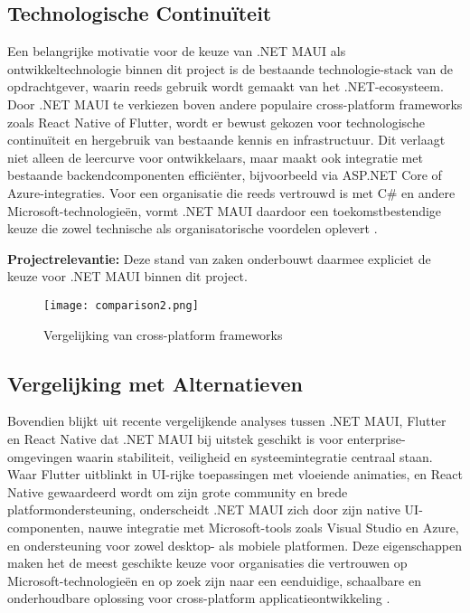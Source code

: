 \subsection{Technologische Continuïteit}
Een belangrijke motivatie voor de keuze van .NET MAUI als ontwikkeltechnologie binnen dit project is de bestaande technologie-stack van de opdrachtgever, waarin reeds gebruik wordt gemaakt van het .NET-ecosysteem. Door .NET MAUI te verkiezen boven andere populaire cross-platform frameworks zoals React Native of Flutter, wordt er bewust gekozen voor technologische continuïteit en hergebruik van bestaande kennis en infrastructuur. Dit verlaagt niet alleen de leercurve voor ontwikkelaars, maar maakt ook integratie met bestaande backendcomponenten efficiënter, bijvoorbeeld via ASP.NET Core of Azure-integraties. Voor een organisatie die reeds vertrouwd is met C# en andere Microsoft-technologieën, vormt .NET MAUI daardoor een toekomstbestendige keuze die zowel technische als organisatorische voordelen oplevert \autocite{Longe2025}.

\textbf{Projectrelevantie:} Deze stand van zaken onderbouwt daarmee expliciet de keuze voor .NET MAUI binnen dit project.

\begin{figure}
	\centering
	\texttt{[image: comparison2.png]}
	\caption[Vergelijking]{Vergelijking van cross-platform frameworks}
\end{figure}

\subsection{Vergelijking met Alternatieven}
Bovendien blijkt uit recente vergelijkende analyses tussen .NET MAUI, Flutter en React Native dat .NET MAUI bij uitstek geschikt is voor enterprise-omgevingen waarin stabiliteit, veiligheid en systeemintegratie centraal staan. Waar Flutter uitblinkt in UI-rijke toepassingen met vloeiende animaties, en React Native gewaardeerd wordt om zijn grote community en brede platformondersteuning, onderscheidt .NET MAUI zich door zijn native UI-componenten, nauwe integratie met Microsoft-tools zoals Visual Studio en Azure, en ondersteuning voor zowel desktop- als mobiele platformen. Deze eigenschappen maken het de meest geschikte keuze voor organisaties die vertrouwen op Microsoft-technologieën en op zoek zijn naar een eenduidige, schaalbare en onderhoudbare oplossing voor cross-platform applicatieontwikkeling \autocite{Gajjam2025}.

